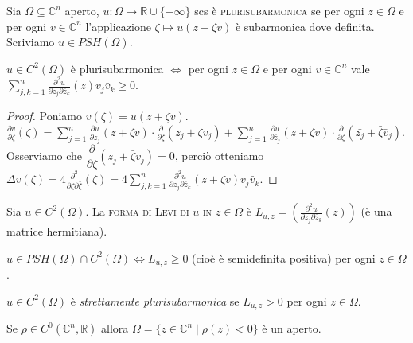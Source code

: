 \begin{defn}
  Sia $\Omega \subseteq \mathbb{C}^n$ aperto, $u:\Omega \longrightarrow \mathbb{R}\cup\{-\infty\}$ scs è \textsc{plurisubarmonica} se per ogni $z \in \Omega$ e per ogni $v \in \mathbb{C}^n$ l'applicazione $\zeta \longmapsto u(z+\zeta v)$ è subarmonica dove definita. Scriviamo $u \in PSH(\Omega)$.
\end{defn}

\begin{prop}
  $u \in C^2(\Omega)$ è plurisubarmonica $\iff$ per ogni $z \in \Omega$ e per ogni $v \in \mathbb{C}^n$ vale $\displaystyle \sum_{j,k=1}^n \frac{\partial^2 u}{\partial z_j\partial\bar{z}_k}(z)v_j\bar{v}_k \ge 0$.
\end{prop}

\begin{proof}
  Poniamo $v(\zeta)=u(z+\zeta v)$. $\displaystyle \frac{\partial v}{\partial\zeta}(\zeta)=\sum_{j=1}^n \frac{\partial u}{\partial z_j}(z+\zeta v) \cdot \frac{\partial}{\partial\zeta}(z_j+\zeta v_j)+\sum_{j=1}^n\frac{\partial u}{\partial\bar{z}_j}(z+\zeta v)\cdot \frac{\partial}{\partial\zeta}(\bar{z_j}+\bar{\zeta}\bar{v}_j)$.
  Osserviamo che $\dfrac{\partial}{\partial\zeta}(\bar{z_j}+\bar{\zeta}\bar{v}_j)=0$, perciò otteniamo $\displaystyle \Delta v(\zeta)=4\frac{\partial^2}{\partial\zeta\partial\bar{\zeta}}(\zeta)=4\sum_{j,k=1}^n \frac{\partial^2 u}{\partial z_j\partial\bar{z}_k}(z+\zeta v)v_j\bar{v}_k$.
\end{proof}

\begin{defn}
  Sia $u \in C^2(\Omega)$. La \textsc{forma di Levi di $u$ in $z \in \Omega$} è $L_{u,z}=\left(\frac{\partial^2 u}{\partial z_j\partial\bar{z}_k}(z)\right)$ (è una matrice hermitiana).
\end{defn}

\begin{oss}
  $u \in PSH(\Omega) \cap C^2(\Omega) \iff L_{u,z} \ge 0$ (cioè è semidefinita positiva) per ogni $z \in \Omega$.
\end{oss}

\begin{defn}
  $u \in C^2(\Omega)$ è \textit{strettamente plurisubarmonica} se $L_{u,z}>0$ per ogni $z \in \Omega$.
\end{defn}

\begin{oss}
  Se $\rho \in C^0(\mathbb{C}^n,\mathbb{R})$ allora $\Omega=\{z \in \mathbb{C}^n \mid \rho(z)<0\}$ è un aperto.
\end{oss}

